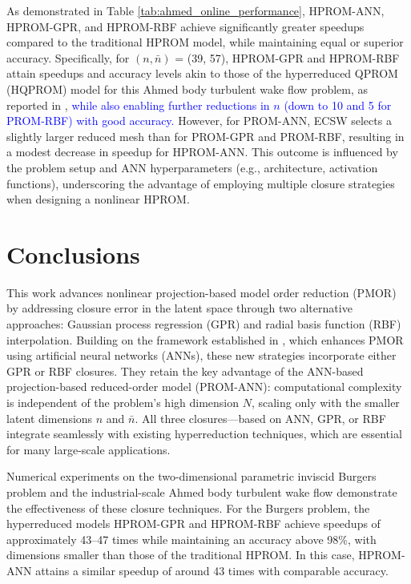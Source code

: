 \documentclass[preprint,10pt]{elsarticle}
\begin{document}
As demonstrated in Table \ref{tab:ahmed_online_performance}, HPROM-ANN, HPROM-GPR, and HPROM-RBF achieve significantly greater speedups
compared to the traditional HPROM model, while maintaining equal or superior accuracy. Specifically, for $(n, \bar{n})$ = (39, 57), 
HPROM-GPR and HPROM-RBF attain speedups and accuracy levels akin to those of the hyperreduced QPROM (HQPROM) model for this Ahmed body 
turbulent wake flow problem, as reported in \cite{barnett2022quadratic}, \textcolor{blue}{while also enabling further reductions in $n$ (down to 10 and 5 for PROM-RBF) with good accuracy.} However, for PROM-ANN, ECSW selects a slightly larger 
reduced mesh than for PROM-GPR and PROM-RBF, resulting in a modest decrease in speedup for HPROM-ANN. This outcome is influenced by the
problem setup and ANN hyperparameters (e.g., architecture, activation functions), underscoring the advantage of employing multiple 
closure strategies when designing a nonlinear HPROM.

\section{Conclusions}
\label{sec:Conc}

This work advances nonlinear projection-based model order reduction (PMOR) by addressing closure error in the latent space through two
alternative approaches: Gaussian process regression (GPR) and radial basis function (RBF) interpolation. Building on the framework 
established in \cite{barnett2023neural, chmiel2025unified}, which enhances PMOR using artificial neural networks (ANNs), these new 
strategies incorporate either GPR or RBF closures. They retain the key advantage of the ANN-based projection-based reduced-order model 
(PROM-ANN): computational complexity is independent of the problem's high dimension $N$, scaling only with the smaller latent 
dimensions $n$ and $\bar{n}$. All three closures—based on ANN, GPR, or RBF integrate seamlessly with existing hyperreduction 
techniques, which are essential for many large-scale applications.

Numerical experiments on the two-dimensional parametric inviscid Burgers problem and the industrial-scale Ahmed body turbulent wake 
flow demonstrate the effectiveness of these closure techniques. For the Burgers problem, the hyperreduced models HPROM-GPR and 
HPROM-RBF achieve speedups of approximately 43–47 times while maintaining an accuracy above 98\%, with dimensions smaller than those 
of the traditional HPROM. In this case, HPROM-ANN attains a similar speedup of around 43 times with comparable accuracy. 
\end{document}
